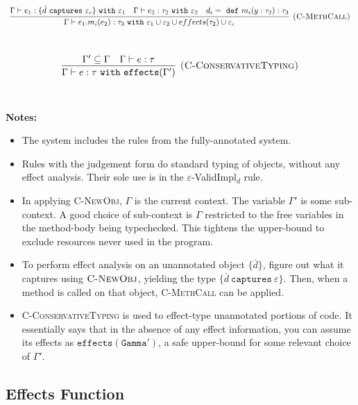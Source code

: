 \documentclass{llncs}
\newcommand{\keywadj}[1]{\mathtt{#1}}
\newcommand{\keyw}[1]{\keywadj{#1}~}
\begin{document}
\[
\begin{array}{c}
\infer[\textsc{(C-MethCall)}]
	{\Gamma \vdash e_1.m_i(e_2) : \tau_3~ \keyw{with} \varepsilon_1 \cup \varepsilon_2 \cup effects(\tau_2) \cup \varepsilon_c}
	{\Gamma \vdash e_1 : \{ \bar d~\keyw{captures} \varepsilon_c \}~\keyw{with} \varepsilon_1 & \Gamma \vdash e_2:\tau_2~\keyw{with} \varepsilon_2&d_i =~\keyw{def} m_i(y:\tau_2):\tau_3 } \\[5ex]
\end{array}
\]

\[
\begin{array}{c}
\infer[\textsc{(C-ConservativeTyping)}]
	{\Gamma \vdash e : \tau ~\keyw{with} \keywadj{effects}(\Gamma') }
	{\Gamma' \subseteq \Gamma & \Gamma \vdash e : \tau } \\[5ex]
\end{array}
\]

\noindent \textbf{Notes:}

\begin{itemize}
	\item The system includes the rules from the fully-annotated system.
	\item Rules with the judgement form do standard typing of objects, without any effect analysis. Their sole use is in the $\varepsilon$-ValidImpl$_d$ rule.
	\item In applying \textsc{C-NewObj}, $\Gamma$ is the current context. The variable $\Gamma'$ is some sub-context. A good choice of sub-context is $\Gamma$ restricted to the free variables in the method-body being typechecked. This tightens the upper-bound to exclude resources never used in the program.
	\item To perform effect analysis on an unannotated object $\{ \bar d \}$, figure out what it captures using $\textsc{C-NewObj}$, yielding the type $\{ \bar d~\keyw{captures} \varepsilon \}$. Then, when a method is called on that object, \textsc{C-MethCall} can be applied.
	\item \textsc{C-ConservativeTyping} is used to effect-type unannotated portions of code. It essentially says that in the absence of any effect information, you can assume its effects as $\keywadj{effects(Gamma')}$, a safe upper-bound for some relevant choice of $\Gamma'$.
\end{itemize}

\subsection{Effects Function}
\end{document}
